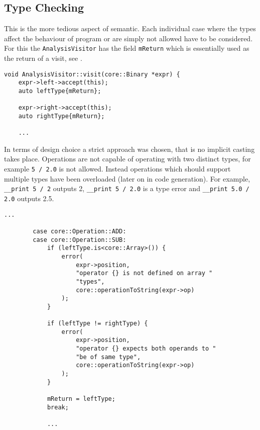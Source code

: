 \subsection{Type Checking}

This is the more tedious aspect of semantic. Each individual
case where the types affect the behaviour of program or are
simply not allowed have to be considered. For this the
\texttt{AnalysisVisitor} has the field \texttt{mReturn} which is
essentially used as the return of a visit, see
.

\begin{lstlisting}[caption={A part of the \texttt{visit(Binary
*)} method in the \texttt{AnalysisVisitor} class
(analysis/AnalysisVisitor.cpp)},label=lst:binaryreturn]
void AnalysisVisitor::visit(core::Binary *expr) {
    expr->left->accept(this);
    auto leftType{mReturn};

    expr->right->accept(this);
    auto rightType{mReturn};

    ...
\end{lstlisting}

In terms of design choice a strict approach was chosen, that is
no implicit casting takes place. Operations are not capable of
operating with two distinct types, for example \texttt{5 / 2.0}
is not allowed. Instead operations which should support multiple
types have been overloaded (later on in code generation). For
example, \texttt{__print 5 / 2} outputs 2, \texttt{__print 5 /
2.0} is a type error and \texttt{__print 5.0 / 2.0} outputs 2.5.

\begin{lstlisting}[caption={Another part of the
\texttt{visit(Binary *)} method in the \texttt{AnalysisVisitor}
class (analysis/AnalysisVisitor.cpp)},label=lst:typechecking2]
        ...

        case core::Operation::ADD:
        case core::Operation::SUB:
            if (leftType.is<core::Array>()) {
                error(
                    expr->position,
                    "operator {} is not defined on array "
                    "types",
                    core::operationToString(expr->op)
                );
            }

            if (leftType != rightType) {
                error(
                    expr->position,
                    "operator {} expects both operands to "
                    "be of same type",
                    core::operationToString(expr->op)
                );
            }

            mReturn = leftType;
            break;

            ...
\end{lstlisting}

